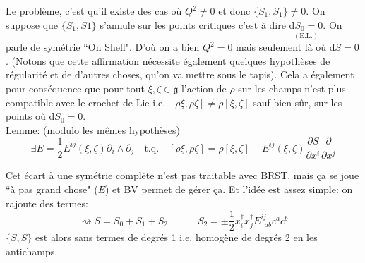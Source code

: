 \documentclass[a4paper,11pt]{article}
\renewcommand{\d}{{\mathrm{d}}}
\newcommand{\dr}[2]{\frac{\partial {#1}}{\partial{#2}}}
\begin{document}
Le problème, c'est qu'il existe des cas où $Q^2\ne0$ et donc $\{S_1,S_1\}\ne 0$. On suppose que $\{S_1,S1\}$ s'annule sur les points critiques c'est à dire $\underset{(\mathrm{E}.\mathrm{L}.)}{\d S_0=0}$. On parle de symétrie ``On Shell". D'où on a bien $Q^2=0$ mais seulement là où $\d S=0$. (Notons que cette affirmation nécessite également quelques hypothèses de régularité et de d'autres choses, qu'on va mettre sous le tapis). Cela a également pour conséquence que pour tout $\xi,\zeta\in\mathfrak{g}$ l'action de $\rho$ sur les champs n'est plus compatible avec le crochet de Lie i.e. $[\rho \xi, \rho \zeta]\ne \rho[\xi,\zeta]$ sauf bien sûr, sur les points où $\d S_0 = 0$.\\

\noindent \underline{Lemme:} (modulo les mêmes hypothèses) 
$$\exists E = \frac12 E^{ij}(\xi,\zeta) \partial_i\wedge\partial_j \quad \mathrm{t}.\mathrm{q}.\quad  [\rho \xi, \rho \zeta] = \rho[\xi,\zeta] + E^{ij}(\xi,\zeta) \dr S{x^i} \dr{}{x^j}$$

Cet écart à une symétrie complète n'est pas traitable avec BRST, mais ça se joue ``à pas grand chose" ($E$) et BV permet de gérer ça. Et l'idée est assez simple: on rajoute des termes:
$$\rightsquigarrow S = S_0 + S_1 + S_2\quad\quad\quad S_2 = \pm \frac12 x_i^\dag x_j^\dag E^{ij}_{\;\;ab}c^ac^b$$
$\{S,S\}$ est alors sans termes de degrés 1 i.e. homogène de degrés 2 en les antichamps.
\end{document}
